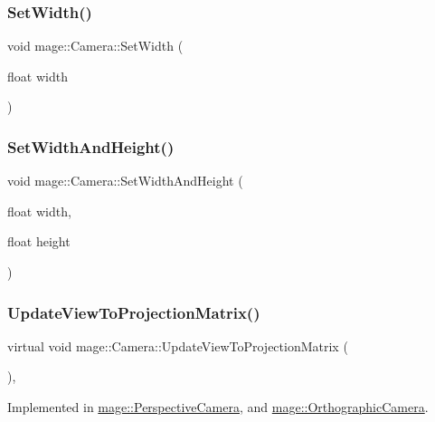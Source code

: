 \subsubsection{\texorpdfstring{Set\+Width()}{SetWidth()}}
{\footnotesize\ttfamily void mage\+::\+Camera\+::\+Set\+Width (\begin{DoxyParamCaption}\item[{float}]{width }\end{DoxyParamCaption})}

\hypertarget{classmage_1_1_camera_a637d09eeedc8015c661751f3b192e252}{}\label{classmage_1_1_camera_a637d09eeedc8015c661751f3b192e252} 
\subsubsection{\texorpdfstring{Set\+Width\+And\+Height()}{SetWidthAndHeight()}}
{\footnotesize\ttfamily void mage\+::\+Camera\+::\+Set\+Width\+And\+Height (\begin{DoxyParamCaption}\item[{float}]{width,  }\item[{float}]{height }\end{DoxyParamCaption})}

\hypertarget{classmage_1_1_camera_a7f43b79d363e0c72b0bb42a06b65fb7e}{}\label{classmage_1_1_camera_a7f43b79d363e0c72b0bb42a06b65fb7e} 
\subsubsection{\texorpdfstring{Update\+View\+To\+Projection\+Matrix()}{UpdateViewToProjectionMatrix()}}
{\footnotesize\ttfamily virtual void mage\+::\+Camera\+::\+Update\+View\+To\+Projection\+Matrix (\begin{DoxyParamCaption}{ }\end{DoxyParamCaption})\hspace{0.3cm}{\ttfamily [protected]}, {}}



Implemented in \hyperlink{classmage_1_1_perspective_camera_a7ae5681ec62be68e4517c0407a1349f6}{mage\+::\+Perspective\+Camera}, and \hyperlink{classmage_1_1_orthographic_camera_a8f1f2c4209b3126c92ecbe8d0e03c23e}{mage\+::\+Orthographic\+Camera}.



